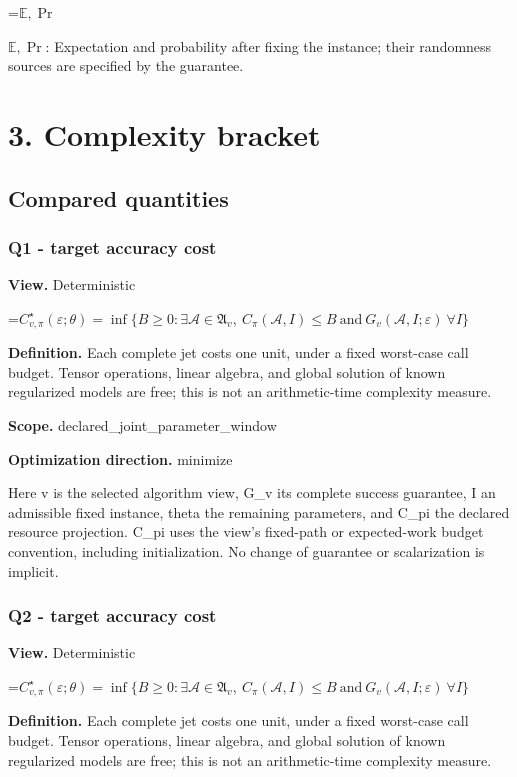 \documentclass[10pt,a4paper]{article}
\newcommand{\AtlasMath}[1]{\par\begingroup\centering\setbox0=\hbox{$\displaystyle #1$}\ifdim\wd0>1.4\linewidth\typeout{ATLAS WIDE FORMULA: \the\wd0}\fi\ifdim\wd0>\linewidth\resizebox{\linewidth}{!}{\box0}\else\box0\fi\par\endgroup}
\newcommand{\AtlasInlineMath}[1]{\begingroup\setbox0=\hbox{$#1$}\ifdim\wd0>.4\linewidth\endgroup\AtlasMath{#1}\else\endgroup$#1$\fi}
\begin{document}
\AtlasInlineMath{\mathbb{E},\Pr}: Expectation and probability after fixing the instance; their randomness sources are specified by the guarantee.

\section{3. Complexity bracket}
\subsection{Compared quantities}
\subsubsection{Q1 - target accuracy cost}
\textbf{View.} Deterministic

\AtlasMath{C^\star_{v,\pi}(\varepsilon;\theta)=\inf\{B\ge0:\exists\mathcal A\in\mathfrak A_v,\ C_\pi(\mathcal A,I)\le B\ \text{and}\ G_v(\mathcal A,I;\varepsilon)\ \forall I\}}
\textbf{Definition.} Each complete jet costs one unit, under a fixed worst-case call budget. Tensor operations, linear algebra, and global solution of known regularized models are free; this is not an arithmetic-time complexity measure.

\textbf{Scope.} declared\_\allowbreak{}joint\_\allowbreak{}parameter\_\allowbreak{}window

\textbf{Optimization direction.} minimize

Here v is the selected algorithm view, G\_\allowbreak{}v its complete success guarantee, I an admissible fixed instance, theta the remaining parameters, and C\_\allowbreak{}pi the declared resource projection. C\_\allowbreak{}pi uses the view's fixed-path or expected-work budget convention, including initialization. No change of guarantee or scalarization is implicit.

\subsubsection{Q2 - target accuracy cost}
\textbf{View.} Deterministic

\AtlasMath{C^\star_{v,\pi}(\varepsilon;\theta)=\inf\{B\ge0:\exists\mathcal A\in\mathfrak A_v,\ C_\pi(\mathcal A,I)\le B\ \text{and}\ G_v(\mathcal A,I;\varepsilon)\ \forall I\}}
\textbf{Definition.} Each complete jet costs one unit, under a fixed worst-case call budget. Tensor operations, linear algebra, and global solution of known regularized models are free; this is not an arithmetic-time complexity measure.
\end{document}
